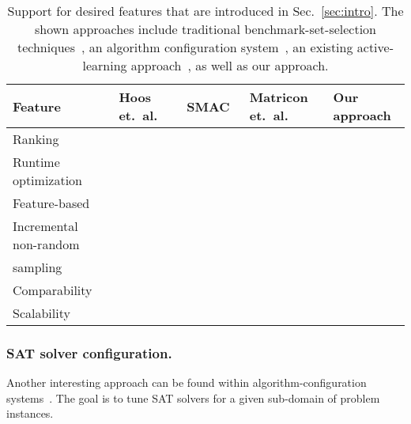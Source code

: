 \documentclass[runningheads]{llncs}
\newcommand{\cmark}{\ding{51}} %
\newcommand{\xmark}{\ding{55}}
\begin{document}
\begin{table}[tbp]
  \centering
  \caption{
  	Support for desired features that are introduced in Sec.~\ref{sec:intro}.
  	The shown approaches include traditional benchmark-set-selection techniques~\cite{HoosKSS13}, an algorithm configuration system~\cite{HutterHL11}, an existing active-learning approach~\cite{MatriconAFSH21}, as well as our approach.
  }
  \label{tab:requirements}
  \vspace{0.2cm}
  \begin{tabular}{
    m{}
    >{\centering\arraybackslash}m{}
    >{\centering\arraybackslash}m{}
    >{\centering\arraybackslash}m{}
    >{\centering\arraybackslash}m{}
  }
    \hline
    Feature & Hoos \mbox{et. al.~\cite{HoosKSS13}} & SMAC~\cite{HutterHL11} & Matricon \mbox{et. al.~\cite{MatriconAFSH21}} & Our approach \\
    \hline
    Ranking & \cmark & \xmark & \cmark & \cmark \\
    Runtime optimization & \xmark & \cmark & \cmark & \cmark \\
    Feature-based & \cmark & \cmark & \cmark & \cmark \\
    Incremental non-random\\ sampling & \xmark & \xmark & \cmark & \cmark \\
    Comparability & \cmark & \xmark & \xmark & \cmark \\
    Scalability & \cmark & \cmark & \xmark & \cmark \\
    \hline
  \end{tabular}
\end{table}

\subsubsection{SAT solver configuration.}
Another interesting approach can be found within algorithm-configuration systems~\cite{HutterHL11,HoosHL21,Stutzle0P22}.
The goal is to tune SAT solvers for a given sub-domain of problem instances.
\end{document}

